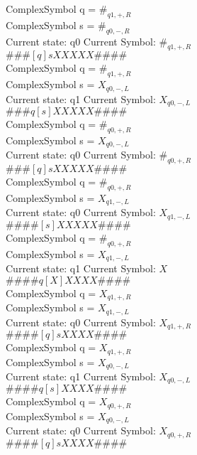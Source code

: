 \documentclass[10pt, a4paper]{article}
\begin{document}
ComplexSymbol q = $\#_{q1,+,R}$ \\
ComplexSymbol s = $\#_{q0,-,R}$ \\ 
 \medskip
Current state: q0	 Current Symbol: 	 $\#_{q1,+,R}$\\
$\# \#\# [ q ] s X X X X X \# \# \# \# $ \\
ComplexSymbol q = $\#_{q1,+,R}$ \\
ComplexSymbol s = $X_{q0,-,L}$ \\ 
 \medskip
Current state: q1	 Current Symbol: 	 $X_{q0,-,L}$\\
$\# \#\# q [ s ] X X X X X \# \# \# \# $ \\
ComplexSymbol q = $\#_{q0,+,R}$ \\
ComplexSymbol s = $X_{q0,-,L}$ \\ 
 \medskip
Current state: q0	 Current Symbol: 	 $\#_{q0,+,R}$\\
$\# \#\# [ q ] s X X X X X \# \# \# \# $ \\
ComplexSymbol q = $\#_{q0,+,R}$ \\
ComplexSymbol s = $X_{q1,-,L}$ \\ 
 \medskip
Current state: q0	 Current Symbol: 	 $X_{q1,-,L}$\\
$\# \#\# \# [ s ] X X X X X \# \# \# \# $ \\
ComplexSymbol q = $\#_{q0,+,R}$ \\
ComplexSymbol s = $X_{q1,-,L}$ \\ 
 \medskip
Current state: q1	 Current Symbol: 	 $X$\\
$\# \#\# \# q [ X ] X X X X \# \# \# \# $ \\
ComplexSymbol q = $X_{q1,+,R}$ \\
ComplexSymbol s = $X_{q1,-,L}$ \\ 
 \medskip
Current state: q0	 Current Symbol: 	 $X_{q1,+,R}$\\
$\# \#\# \# [ q ] s X X X X \# \# \# \# $ \\
ComplexSymbol q = $X_{q1,+,R}$ \\
ComplexSymbol s = $X_{q0,-,L}$ \\ 
 \medskip
Current state: q1	 Current Symbol: 	 $X_{q0,-,L}$\\
$\# \#\# \# q [ s ] X X X X \# \# \# \# $ \\
ComplexSymbol q = $X_{q0,+,R}$ \\
ComplexSymbol s = $X_{q0,-,L}$ \\ 
 \medskip
Current state: q0	 Current Symbol: 	 $X_{q0,+,R}$\\
$\# \#\# \# [ q ] s X X X X \# \# \# \# $ \\
\end{document}
